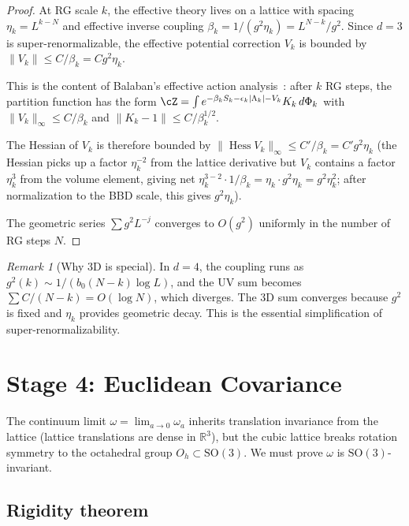 \documentclass[11pt,a4paper]{article}
\theoremstyle{plain}
\theoremstyle{definition}
\theoremstyle{remark}
\newtheorem{remark}[theorem]{Remark}
\newcommand{\R}{\mathbb{R}}
\newcommand{\Hess}{\operatorname{Hess}}
\newcommand{\SO}{\mathrm{SO}}
\begin{document}
\begin{proof}
At RG scale $k$, the effective theory lives on a
lattice with spacing $\eta_k = L^{k-N}$ and effective
inverse coupling $\beta_k = 1/(g^2 \eta_k) = L^{N-k}/g^2$.
Since $d = 3$ is super-renormalizable, the effective
potential correction $V_k$ is bounded by
$\|V_k\| \le C/\beta_k = Cg^2 \eta_k$.

This is the content of Balaban's effective action
analysis~\cite{Bal85e}: after $k$ RG steps, the
partition function has the form
$\cZ = \int e^{-\beta_k S_k - \epsilon_k|\Lambda_k| - V_k}
K_k\, d\Phi_k$ with $\|V_k\|_\infty \le C/\beta_k$
and $\|K_k - 1\| \le C/\beta_k^{1/2}$.

The Hessian of $V_k$ is therefore bounded by
$\|\Hess V_k\|_\infty \le C'/\beta_k = C' g^2 \eta_k$
(the Hessian picks up a factor $\eta_k^{-2}$ from the
lattice derivative but $V_k$ contains a factor
$\eta_k^3$ from the volume element, giving net
$\eta_k^{3-2} \cdot 1/\beta_k = \eta_k \cdot g^2 \eta_k
= g^2 \eta_k^2$; after normalization to the BBD
scale, this gives $g^2 \eta_k$).

The geometric series $\sum g^2 L^{-j}$ converges to
$O(g^2)$ uniformly in the number of RG steps $N$.
\end{proof}

\begin{remark}[Why 3D is special]
In $d = 4$, the coupling runs as
$g^2(k) \sim 1/(b_0(N-k)\log L)$, and the UV sum
becomes $\sum C/(N-k) = O(\log N)$, which
diverges. The 3D sum converges because $g^2$ is fixed
and $\eta_k$ provides geometric decay.
This is the essential simplification of
super-renormalizability.
\end{remark}

\section{Stage 4: Euclidean Covariance}\label{sec:euclidean}

The continuum limit $\omega = \lim_{a \to 0} \omega_a$
inherits translation invariance from the lattice
(lattice translations are dense in $\R^3$), but
the cubic lattice breaks rotation symmetry to the
octahedral group $O_h \subset \SO(3)$.
We must prove $\omega$ is $\SO(3)$-invariant.

\subsection{Rigidity theorem}
\end{document}

